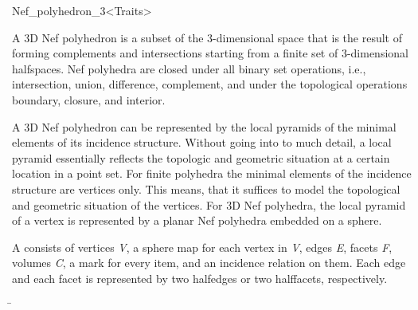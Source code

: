 
\begin{ccRefClass}{Nef_polyhedron_3<Traits>}

\ccDefinition

A 3D Nef polyhedron is a subset of the 3-dimensional space that is the
result of forming complements and intersections starting from a finite
set  of 3-dimensional halfspaces. Nef polyhedra are closed
under all binary set operations, i.e., intersection, union,
difference, complement, and under the topological operations boundary,
closure, and interior.

A 3D Nef polyhedron can be represented by the local pyramids of the minimal
elements of its incidence structure. Without going into to much detail, a local
pyramid essentially reflects the topologic and geometric situation at a certain
location in a point set. For finite polyhedra the minimal elements 
of the incidence structure are vertices only. This means, that it suffices to 
model the topological and geometric situation of the vertices. For 
3D Nef polyhedra, the local pyramid of a vertex is represented by 
a planar Nef polyhedra embedded on a sphere.

A  consists of vertices \emph{V}, a sphere map for each
vertex in \emph{V}, edges \emph{E}, facets \emph{F}, volumes \emph{C}, a mark
for every item, and an incidence relation on them. Each edge and each facet
is represented by two halfedges or two halffacets, respectively.


\ccParameters

\begin{tabbing}
 \=\\
                 \>\\
                 \>\\
\end{tabbing}


\end{ccRefClass}
